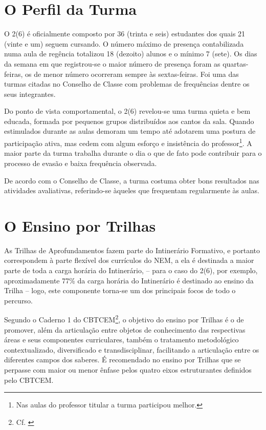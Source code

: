 \section{O Perfil da Turma} %
\label{sec:Perfil da Turma}

O 2(6) é oficialmente composto por 36 (trinta e seis) estudantes dos quais 21 (vinte e um) seguem cursando. O número máximo de presença contabilizada numa aula de regência totalizou 18 (dezoito) alunos e o mínimo 7 (sete). Os dias da semana em que registrou-se o maior número de presença foram as quartas-feiras, os de menor número ocorreram sempre às sextas-feiras. Foi uma das turmas citadas no Conselho de Classe com problemas de frequências dentre os seus integrantes.

Do ponto de vista comportamental, o 2(6) revelou-se uma turma quieta e bem educada, formada por pequenos grupos distribuídos aos cantos da sala. Quando estimulados durante as aulas demoram um tempo até adotarem uma postura de participação ativa, mas cedem com algum esforço e insistência do professor\footnote{Nas aulas do professor titular a turma participou melhor.}. A maior parte da turma trabalha durante o dia o que de fato pode contribuir para o processo de evasão e baixa frequência observada. 

De acordo com o Conselho de Classe, a turma costuma obter bons resultados nas atividades avaliativas, referindo-se àqueles que frequentam regularmente às aulas.

\section{O Ensino por Trilhas} %
\label{sec:O Ensino por Trilhas}
As Trilhas de Aprofundamentos fazem parte do Intinerário Formativo, e portanto correspondem à parte flexível dos currículos do \ac{NEM}, a ela é destinada a maior parte de toda a carga horária do Intinerário, -- para o caso do 2(6), por exemplo, aproximadamente 77\% da carga horária do Intinerário é destinado ao ensino da Trilha -- logo, este componente torna-se um dos principais focos de todo o percurso.

Segundo o Caderno 1 do \ac{CBTCEM}\footnote{Cf. \cite{CATARINA:2021}}, o objetivo do ensino por Trilhas é o de promover, além da articulação entre objetos de conhecimento das respectivas áreas e seus componentes curriculares, também o tratamento metodológico contextualizado, diversificado e transdisciplinar, facilitando a articulação entre os diferentes campos dos saberes. É recomendado no ensino por Trilhas que se perpasse com maior ou menor ênfase pelos quatro eixos estruturantes definidos pelo \ac{CBTCEM}.

